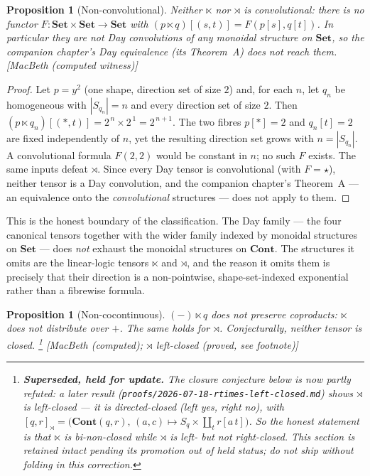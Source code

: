 \documentclass[11pt,a4paper]{article}
\newcommand{\Set}{\mathbf{Set}}
\newcommand{\Cont}{\mathbf{Cont}}
\theoremstyle{plain}
\newtheorem{Proposition}[Theorem]{Proposition}
\theoremstyle{definition}
\theoremstyle{remark}
\newcommand{\prov}[1]{\hfill\textsf{\footnotesize[#1]}}
\begin{document}
\begin{Proposition}[Non-convolutional]
\label{prop:nonconv}
Neither $\ltimes$ nor $\rtimes$ is convolutional: there is no functor
$F\colon\Set\times\Set\to\Set$ with $(p\ltimes q)[(s,t)]=F(p[s],q[t])$. In
particular they are not Day convolutions of any monoidal structure on $\Set$, so
the companion chapter's Day equivalence (its Theorem~A) does not reach them.
\prov{MacBeth (computed witness)}
\end{Proposition}

\begin{proof}
Let $p=y^{2}$ (one shape, direction set of size $2$) and, for each $n$, let
$q_n$ be homogeneous with $|S_{q_n}|=n$ and every direction set of size $2$.
Then $(p\ltimes q_n)[(\ast,t)]=2^{\,n}\times 2^{\,1}=2^{\,n+1}$. The two fibres
$p[\ast]=2$ and $q_n[t]=2$ are fixed independently of $n$, yet the resulting
direction set grows with $n=|S_{q_n}|$. A convolutional formula $F(2,2)$ would be
constant in $n$; no such $F$ exists. The same inputs defeat $\rtimes$. Since
every Day tensor is convolutional (with $F=\star$), neither tensor is a Day
convolution, and the companion chapter's Theorem~A --- an equivalence onto the
\emph{convolutional} structures --- does not apply to them.
\end{proof}

This is the honest boundary of the classification. The Day family --- the four
canonical tensors together with the wider family indexed by monoidal structures
on $\Set$ --- does \emph{not} exhaust the monoidal structures on $\Cont$. The
structures it omits are the linear-logic tensors $\ltimes$ and $\rtimes$, and
the reason it omits them is precisely that their direction is a non-pointwise,
shape-set-indexed exponential rather than a fibrewise formula.

\begin{Proposition}[Non-cocontinuous]
\label{prop:noncocont}
$(-)\ltimes q$ does not preserve coproducts: $\ltimes$ does not distribute over
$+$. The same holds for $\rtimes$. Conjecturally, neither tensor is closed.%
\footnote{\textbf{Superseded, held for update.} The closure conjecture below is
now partly refuted: a later result (\texttt{proofs/2026-07-18-rtimes-left-closed.md})
shows $\rtimes$ \emph{is} left-closed --- it is \emph{directed}-closed (left yes,
right no), with $[q,r]_\rtimes=\bigl(\Cont(q,r),\,(a,c)\mapsto S_q\times
\coprod_t r[a\,t]\bigr)$. So the honest statement is that $\ltimes$ is bi-non-closed
while $\rtimes$ is left- but not right-closed. This section is retained
\emph{intact} pending its promotion out of held status; do not ship without
folding in this correction.}
\prov{MacBeth (computed); $\rtimes$ left-closed (proved, see footnote)}
\end{Proposition}
\end{document}
